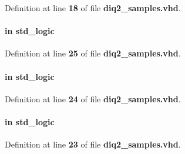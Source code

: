 Definition at line {\bf 18} of file {\bf diq2\+\_\+samples.\+vhd}.

\paragraph[{clk}]{ {\bfseries \textcolor{keywordflow}{in}\textcolor{vhdlchar}{ }} {\bfseries \textcolor{comment}{std\+\_\+logic}\textcolor{vhdlchar}{ }} \hspace{0.3cm}{\ttfamily [Port]}}\label{classdiq2__samples_a4a4609c199d30b3adebbeb3a01276ec5}


Definition at line {\bf 25} of file {\bf diq2\+\_\+samples.\+vhd}.

\paragraph[{clk\+\_\+iodirect}]{ {\bfseries \textcolor{keywordflow}{in}\textcolor{vhdlchar}{ }} {\bfseries \textcolor{comment}{std\+\_\+logic}\textcolor{vhdlchar}{ }} \hspace{0.3cm}{\ttfamily [Port]}}\label{classdiq2__samples_a6b08d262ee0d5f41c1da1c75345c9eda}


Definition at line {\bf 24} of file {\bf diq2\+\_\+samples.\+vhd}.

\paragraph[{clk\+\_\+iopll}]{ {\bfseries \textcolor{keywordflow}{in}\textcolor{vhdlchar}{ }} {\bfseries \textcolor{comment}{std\+\_\+logic}\textcolor{vhdlchar}{ }} \hspace{0.3cm}{\ttfamily [Port]}}\label{classdiq2__samples_acee5ec4ffa4474a43839d26dda7fd987}


Definition at line {\bf 23} of file {\bf diq2\+\_\+samples.\+vhd}.

